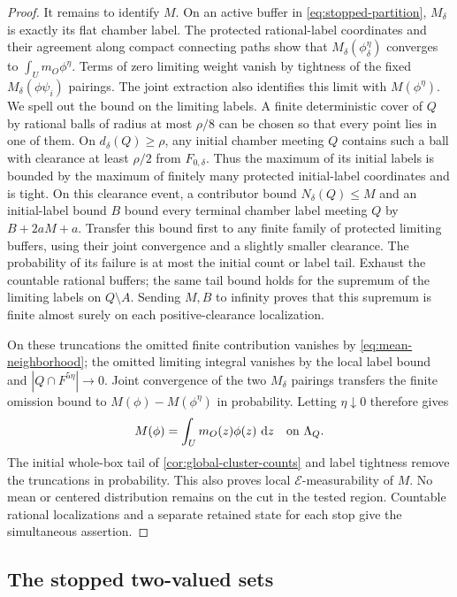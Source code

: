 \begin{proof}
It remains to identify \(M\). On an active buffer in
\eqref{eq:stopped-partition}, \(M_\delta\) is exactly its flat chamber
label. The protected rational-label coordinates and their agreement along
compact connecting paths show that
\(M_\delta(\phi_\delta^\eta)\) converges to
\(\int_U m_O\phi^\eta\). Terms of zero limiting weight vanish by
tightness of the fixed \(M_\delta(\phi\psi_i)\) pairings. The joint extraction also identifies this
limit with \(M(\phi^\eta)\). We spell out the bound on the limiting
labels. A finite deterministic cover of \(Q\) by rational balls of
radius at most \(\rho/8\) can be chosen so that every point lies in one
of them. On \(d_\delta(Q)\ge\rho\), any initial chamber meeting \(Q\)
contains such a ball with clearance at least \(\rho/2\) from
\(F_{0,\delta}\). Thus the maximum of its initial labels is bounded by
the maximum of finitely many protected initial-label coordinates and
is tight. On this clearance event, a contributor bound \(N_\delta(Q)\le M\)
and an initial-label bound \(B\) bound every terminal chamber label meeting
\(Q\) by \(B+2aM+a\). Transfer this bound first to any finite family
of protected limiting buffers, using their joint convergence and a
slightly smaller clearance. The probability of its failure is at most
the initial count or label tail. Exhaust the countable rational buffers;
the same tail bound holds for the supremum of the limiting labels on
\(Q\setminus A\). Sending \(M,B\) to infinity proves that this supremum
is finite almost surely on each positive-clearance localization.

On these truncations the omitted finite contribution vanishes by
\eqref{eq:mean-neighborhood}; the omitted limiting integral vanishes
by the local label bound and \(|Q\cap F^{5\eta}|\to0\). Joint convergence
of the two \(M_\delta\) pairings transfers the finite omission bound
to \(M(\phi)-M(\phi^\eta)\) in probability. Letting \(\eta\downarrow0\)
therefore gives
\[
                 M(\phi)=\int_U m_O(z)\phi(z)\,\,\mathrm d z
       \quad\hbox{on }\Lambda_Q.
\]
The initial whole-box tail of \cref{cor:global-cluster-counts} and label tightness remove the truncations
in probability. This also proves local \(\mathscr E\)-measurability of
\(M\). No mean or centered distribution remains on the cut in the
tested region. Countable rational localizations and a separate retained
state for each stop give the simultaneous assertion.
\end{proof}

\subsection{The stopped two-valued sets}

